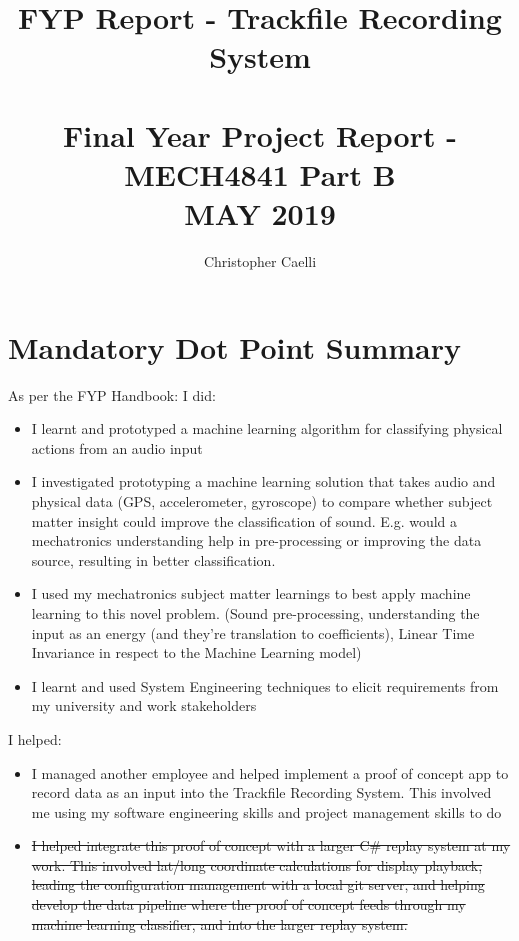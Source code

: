 \documentclass{UoNMCHA}
\numberwithin{equation}{section}
\begin{document}
\title{FYP Report - Trackfile Recording System \\ \ \\
{\small Final Year Project Report - MECH4841 Part B  \\MAY 2019}}
\author[UoNMCHA]{Christopher Caelli}
\address[UoNMCHA]{
Student of Mechatronics Engineering,\\
The University of Newcastle, Callaghan, NSW 2308, AUSTRALIA \\
Student Number: 3206246 \\
E-mail: \href{mailto:Christopher.Caelli@uon.edu.au}{\textsf{Christopher.Caelli@uon.edu.au}}}
\maketitle
\onecolumn

\vspace{-5mm}
\section*{Mandatory Dot Point Summary}
\vspace{-3mm}
As per the FYP Handbook: \newline
I did:
\begin{itemize}
    \item I learnt and prototyped a machine learning algorithm for classifying physical actions from an audio input
    \item I investigated prototyping a machine learning solution that takes audio and physical data (GPS, accelerometer, gyroscope) to compare whether subject matter insight could improve the classification of sound. E.g. would a mechatronics understanding help in pre-processing or improving the data source, resulting in better classification.
    \item I used my mechatronics subject matter learnings to best apply machine learning to this novel problem. (Sound pre-processing, understanding the input as an energy (and they're translation to coefficients), Linear Time Invariance in respect to the Machine Learning model)
    \item I learnt and used System Engineering techniques to elicit requirements from my university and work stakeholders
\end{itemize}
I helped:
\begin{itemize}
   \item I managed another employee and helped implement a proof of concept app to record data as an input into the Trackfile Recording System. This involved me using my software engineering skills and project management skills to do
    \item \sout{I helped integrate this proof of concept with a larger C\# replay system at my work. This involved lat/long coordinate calculations for display playback, leading the configuration management with a local git server, and helping develop the data pipeline where the proof of concept feeds through my machine learning classifier, and into the larger replay system.}
\end{itemize}
\newpage
\end{document}

